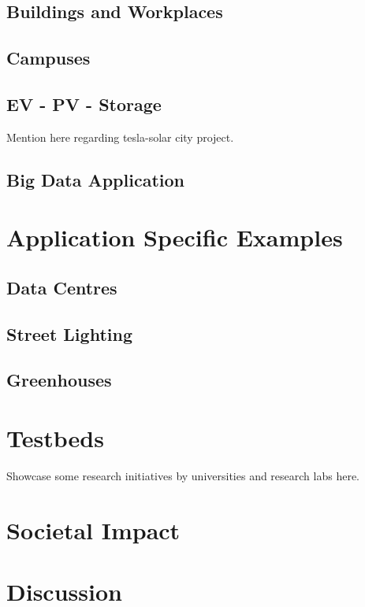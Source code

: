 \documentclass[10pt]{IETBook}
\begin{document}
\subsection{Buildings and Workplaces}
\subsection{Campuses}
\subsection{EV - PV - Storage}
Mention here regarding tesla-solar city project.
\subsection{Big Data Application}

\section{Application Specific Examples}
\subsection{Data Centres}
\subsection{Street Lighting}
\subsection{Greenhouses}

\section{Testbeds}
Showcase some research initiatives by universities and research labs here.

\section{Societal Impact}
\section{Discussion}


\end{document}
